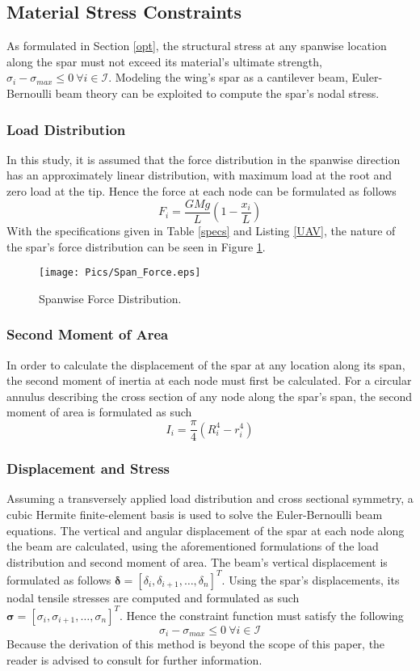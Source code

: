 \documentclass{article}
\begin{document}
\subsection{Material Stress Constraints}
As formulated in Section \ref{opt}, the structural stress at any spanwise location along the spar must not exceed its material's ultimate strength, $\sigma_i - \sigma_{max} \leq 0 ~ \forall i \in \mathcal{I}$. Modeling the wing's spar as a cantilever beam, Euler-Bernoulli beam theory can be exploited to compute the spar's nodal stress.

\subsubsection{Load Distribution}
In this study, it is assumed that the force distribution in the spanwise direction has an approximately linear distribution, with maximum load at the root and zero load at the tip. Hence the force at each node can be formulated as follows
$$ F_i = \frac{GMg}{L} \left ( 1-\frac{x_i}{L} \right )$$ With the specifications given in Table \ref{specs} and Listing \ref{UAV}, the nature of the spar's force distribution can be seen in Figure \ref{fig:force}.

\begin{figure}
    \caption{Spanwise Force Distribution.}
    \centering
    \texttt{[image: Pics/Span\_Force.eps]}
    \label{fig:force}
\end{figure}

\subsubsection{Second Moment of Area}
In order to calculate the displacement of the spar at any location along its span, the second moment of inertia at each node must first be calculated. For a circular annulus describing the cross section of any node along the spar's span, the second moment of area is formulated as such
$$ I_i = \frac{\pi}{4} \left ( R_i^4 - r_i^4 \right )$$

\subsubsection{Displacement and Stress}
Assuming a transversely applied load distribution and cross sectional symmetry, a cubic Hermite finite-element basis is used to solve the Euler-Bernoulli beam equations. The vertical and angular displacement of the spar at each node along the beam are calculated, using the aforementioned formulations of the load distribution and second moment of area. The beam's vertical displacement is formulated as follows $ \mathbf{\delta} = [\delta_i, \delta_{i+1}, \dots, \delta_n]^T $. Using the spar's displacements, its nodal tensile stresses are computed and formulated as such
$\mathbf{\sigma} = [\sigma_i, \sigma_{i+1}, \dots, \sigma_n]^T $. Hence the constraint function must satisfy the following 
$$\sigma_i - \sigma_{max} \leq 0 ~\forall i \in \mathcal{I}$$ 
Because the derivation of this method is beyond the scope of this paper, the reader is advised to consult \cite{Kuo2006} for further information.
\end{document}
